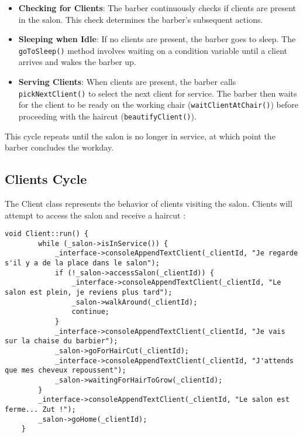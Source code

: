 \documentclass{article}
\begin{document}
    \begin{itemize}
    \item \textbf{Checking for Clients}: The barber continuously checks if clients are present in the salon. This check determines the barber's subsequent actions.
    \item \textbf{Sleeping when Idle}: If no clients are present, the barber goes to sleep. The \texttt{goToSleep()} method involves waiting on a condition variable until a client arrives and wakes the barber up.
    \item \textbf{Serving Clients}: When clients are present, the barber calls \texttt{pickNextClient()} to select the next client for service. The barber then waits for the client to be ready on the working chair (\texttt{waitClientAtChair()}) before proceeding with the haircut (\texttt{beautifyClient()}).
    \end{itemize}

    This cycle repeats until the salon is no longer in service, at which point the barber concludes the workday.

    \subsection{Clients Cycle}

    The Client class represents the behavior of clients visiting the salon.
    Clients will attempt to access the salon and receive a haircut :

    \begin{lstlisting}[caption={The clients operational cycle}, captionpos=b, label=lst:2]
    void Client::run() {
        while (_salon->isInService()) {
            _interface->consoleAppendTextClient(_clientId, "Je regarde s'il y a de la place dans le salon");
            if (!_salon->accessSalon(_clientId)) {
                _interface->consoleAppendTextClient(_clientId, "Le salon est plein, je reviens plus tard");
                _salon->walkAround(_clientId);
                continue;
            }
            _interface->consoleAppendTextClient(_clientId, "Je vais sur la chaise du barbier");
            _salon->goForHairCut(_clientId);
            _interface->consoleAppendTextClient(_clientId, "J'attends que mes cheveux repoussent");
            _salon->waitingForHairToGrow(_clientId);
        }
        _interface->consoleAppendTextClient(_clientId, "Le salon est ferme... Zut !");
        _salon->goHome(_clientId);
    }

    \end{lstlisting}
\end{document}
